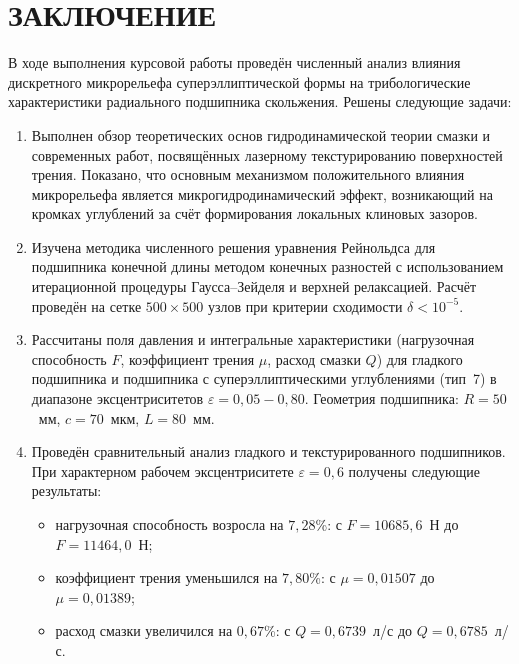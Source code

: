 \section*{ЗАКЛЮЧЕНИЕ}
{}

В ходе выполнения курсовой работы проведён численный анализ влияния дискретного микрорельефа суперэллиптической формы на трибологические характеристики радиального подшипника скольжения. Решены следующие задачи:

\begin{enumerate}
    \item Выполнен обзор теоретических основ гидродинамической теории смазки и современных работ, посвящённых лазерному текстурированию поверхностей трения. Показано, что основным механизмом положительного влияния микрорельефа является микрогидродинамический эффект, возникающий на кромках углублений за счёт формирования локальных клиновых зазоров.

    \item Изучена методика численного решения уравнения Рейнольдса для подшипника конечной длины методом конечных разностей с использованием итерационной процедуры Гаусса--Зейделя и верхней релаксацией. Расчёт проведён на сетке $500 \times 500$ узлов при критерии сходимости $\delta < 10^{-5}$.

    \item Рассчитаны поля давления и интегральные характеристики (нагрузочная способность $F$, коэффициент трения $\mu$, расход смазки $Q$) для гладкого подшипника и подшипника с суперэллиптическими углублениями (тип~7) в диапазоне эксцентриситетов $\varepsilon = 0{,}05 - 0{,}80$. Геометрия подшипника: $R = 50$~мм, $c = 70$~мкм, $L = 80$~мм.

    \item Проведён сравнительный анализ гладкого и текстурированного подшипников. При характерном рабочем эксцентриситете $\varepsilon = 0{,}6$ получены следующие результаты:
    \begin{itemize}
        \item нагрузочная способность возросла на $7{,}28$\%: с $F = 10685{,}6$~Н до $F = 11464{,}0$~Н;
        \item коэффициент трения уменьшился на $7{,}80$\%: с $\mu = 0{,}01507$ до $\mu = 0{,}01389$;
        \item расход смазки увеличился на $0{,}67$\%: с $Q = 0{,}6739$~л/с до $Q = 0{,}6785$~л/с.
    \end{itemize}
\end{enumerate}

